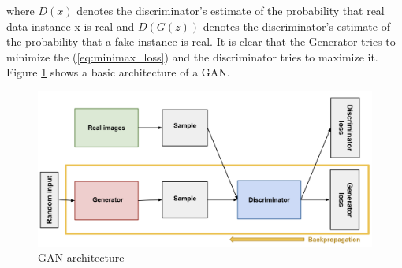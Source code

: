 where $D(x)$  denotes the discriminator's estimate of the probability that real data instance x is
real and $D(G(z))$ denotes the discriminator's estimate of the probability that a fake instance is
real. It is clear that the Generator tries to minimize the (\ref{eq:minimax_loss}) and the
discriminator tries to maximize it. Figure \ref{fig:gan_architecture} shows a basic architecture of a
GAN.

\begin{figure}
  \centering
  \label{fig:gan_architecture}
  \includegraphics[width=1\textwidth]{fig/gan_architectur}
  \caption{GAN architecture
    \cite{google_bayesian_approach}}
\end{figure}

